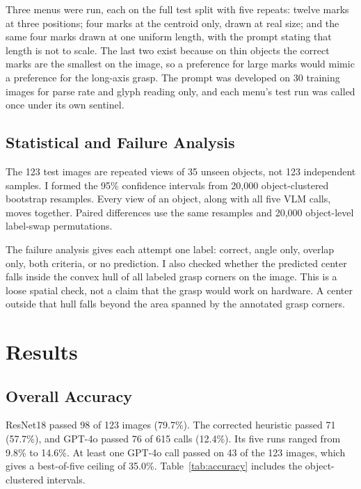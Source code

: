 \documentclass[10pt,conference,compsoc]{IEEEtran}
\begin{document}
Three menus were run, each on the full test split with five repeats: twelve
marks at three positions; four marks at the centroid only, drawn at real
size; and the same four marks drawn at one uniform length, with the prompt
stating that length is not to scale. The last two exist because on thin
objects the correct marks are the smallest on the image, so a preference for
large marks would mimic a preference for the long-axis grasp. The prompt was
developed on 30 training images for parse rate and glyph reading only, and
each menu's test run was called once under its own sentinel.

\subsection{Statistical and Failure Analysis}

The 123 test images are repeated views of 35 unseen objects, not 123
independent samples. I formed the 95\% confidence intervals from 20,000
object-clustered bootstrap resamples. Every view of an object, along with all
five VLM calls, moves together. Paired differences use the same resamples and
20,000 object-level label-swap permutations.

The failure analysis gives each attempt one label: correct, angle only,
overlap only, both criteria, or no prediction. I also checked whether the
predicted center falls inside the convex hull of all labeled grasp corners on
the image. This is a loose spatial check, not a claim that the grasp would
work on hardware. A center outside that hull falls beyond the area spanned by
the annotated grasp corners.

\section{Results}

\subsection{Overall Accuracy}

ResNet18 passed 98 of 123 images (79.7\%). The corrected heuristic passed 71
(57.7\%), and GPT-4o passed 76 of 615 calls (12.4\%). Its five runs ranged
from 9.8\% to 14.6\%. At least one GPT-4o call passed on 43 of the 123 images,
which gives a best-of-five ceiling of 35.0\%. Table~\ref{tab:accuracy} includes
the object-clustered intervals.
\end{document}
